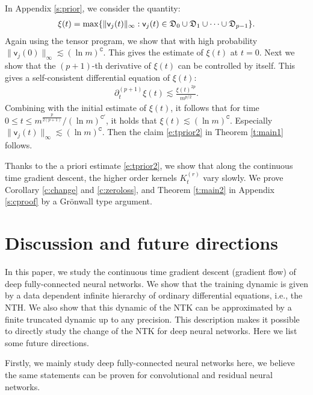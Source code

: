 \documentclass{article}
\numberwithin{equation}{section}
\newcommand{\fC}{{\mathtt C}}
\newcommand{\fD}{{\frak D}}
\newcommand{\sfv}{{\mathsf v}}
\renewcommand{\leq}{\leqslant}
\newcommand{\del}{\partial}
\newcommand{\1}{\mathds{1}}
\theoremstyle{plain} %
\begin{document}
In Appendix \ref{s:prior}, we consider the quantity:
\begin{align*}
 \xi(t)=\max\{\|\sfv_j(t)\|_\infty: \sfv_j(t)\in \fD_0\cup\fD_1\cup\cdots\cup \fD_{p-1}\}.
 \end{align*}
Again using the tensor program, we show that with high probability $\|\sfv_j(0)\|_\infty\lesssim (\ln m)^\fC$. This gives the estimate of $\xi(t)$ at $t=0$. Next we show that the $(p+1)$-th derivative of $\xi(t)$ can be controlled by itself. This gives a self-consistent differential equation of $\xi(t)$:
\begin{align}
\del^{(p+1)}_{t}\xi(t)\lesssim \frac{\xi(t)^{2p}}{m^{p/2}}.
\end{align}
 Combining with the initial estimate of $\xi(t)$, it follows that for time ${0\leq  t\leq m^{\frac{p}{2(p+1)}}}/(\ln m)^{\fC'}$, it holds that $\xi(t)\lesssim (\ln m)^{\fC}$. Especially $\|\sfv_j(t)\|_\infty\lesssim (\ln m)^\fC$. Then the claim \eqref{e:tprior2} in Theorem \ref{t:main1} follows.

Thanks to the a priori estimate \eqref{e:tprior2}, we show that along the continuous time gradient descent, the higher order kernels $K_t^{(r)}$ vary slowly. We prove Corollary \ref{c:change} and \ref{c:zeroloss}, and Theorem \ref{t:main2} in Appendix \ref{s:cproof} by a Gr{\" o}nwall type argument. 


\section{Discussion and future directions}
In this paper, we study the continuous time gradient descent (gradient flow) of deep fully-connected neural networks. We show that the training dynamic is given by a data dependent infinite hierarchy of ordinary differential equations, i.e., the NTH. We also show that this dynamic of the NTK can be approximated by a finite truncated dynamic up to any precision. This description makes it possible to directly study the change of the NTK for deep neural networks. Here we list some future directions.


Firstly, we mainly study deep fully-connected neural networks here, we believe the same statements can be proven for convolutional and residual neural networks.
\end{document}
